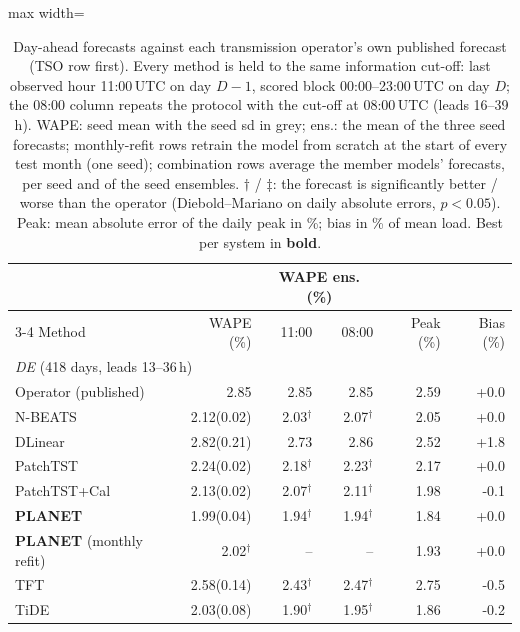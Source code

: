 \begin{table}[!t]
\centering
\caption{Day-ahead forecasts against each transmission operator's own published forecast (TSO row first). Every method is held to the same information cut-off: last observed hour 11:00\,UTC on day $D-1$, scored block 00:00--23:00\,UTC on day $D$; the 08:00 column repeats the protocol with the cut-off at 08:00\,UTC (leads 16--39\,h). WAPE: seed mean with the seed sd in grey; ens.: the mean of the three seed forecasts; monthly-refit rows retrain the model from scratch at the start of every test month (one seed); combination rows average the member models' forecasts, per seed and of the seed ensembles. $\dagger$ / $\ddagger$: the forecast is significantly better / worse than the operator (Diebold--Mariano on daily absolute errors, $p<0.05$). Peak: mean absolute error of the daily peak in \%; bias in \% of mean load. Best per system in \textbf{bold}.}
\label{tab:dayahead-v2}
\setlength{\tabcolsep}{2.5pt}\footnotesize
\begin{adjustbox}{max width=\linewidth}
\begin{tabular}{lrrrrr}
\toprule
 & & \multicolumn{2}{c}{WAPE ens. (\%)} & & \\
\cmidrule(lr){3-4}
Method & WAPE (\%) & 11:00 & 08:00 & Peak (\%) & Bias (\%) \\
\midrule
\multicolumn{6}{l}{\textit{DE} (418 days, leads 13--36\,h)} \\
\quad Operator (published) & 2.85 & 2.85 & 2.85 & 2.59 & +0.0 \\
\quad N-BEATS & 2.12{\scriptsize\color{gray}(0.02)} & 2.03$^{\dagger}$ & 2.07$^{\dagger}$ & 2.05 & +0.0 \\
\quad DLinear & 2.82{\scriptsize\color{gray}(0.21)} & 2.73 & 2.86 & 2.52 & +1.8 \\
\quad PatchTST & 2.24{\scriptsize\color{gray}(0.02)} & 2.18$^{\dagger}$ & 2.23$^{\dagger}$ & 2.17 & +0.0 \\
\quad PatchTST+Cal & 2.13{\scriptsize\color{gray}(0.02)} & 2.07$^{\dagger}$ & 2.11$^{\dagger}$ & 1.98 & -0.1 \\
\quad \textbf{PLANET} & 1.99{\scriptsize\color{gray}(0.04)} & 1.94$^{\dagger}$ & 1.94$^{\dagger}$ & 1.84 & +0.0 \\
\quad \textbf{PLANET} (monthly refit) & 2.02$^{\dagger}$ & -- & -- & 1.93 & +0.0 \\
\quad TFT & 2.58{\scriptsize\color{gray}(0.14)} & 2.43$^{\dagger}$ & 2.47$^{\dagger}$ & 2.75 & -0.5 \\
\quad TiDE & 2.03{\scriptsize\color{gray}(0.08)} & 1.90$^{\dagger}$ & 1.95$^{\dagger}$ & 1.86 & -0.2 \\

\end{tabular}
\end{adjustbox}
\end{table}
